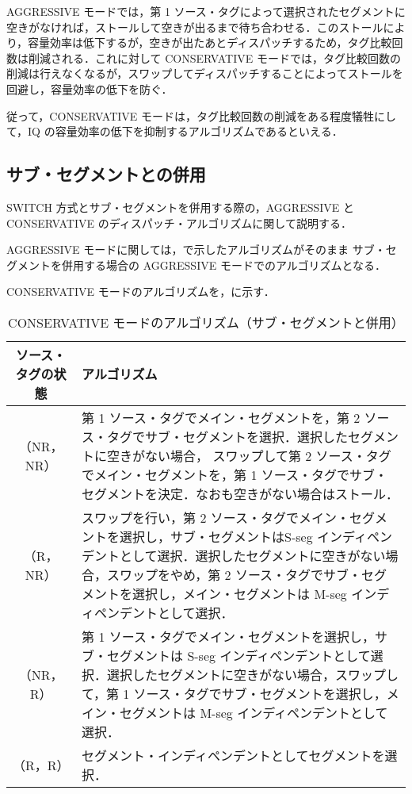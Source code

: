 AGGRESSIVE モードでは，第 1 ソース・タグによって選択されたセグメントに空きがなければ，ストールして空きが出るまで待ち合わせる．このストールにより，容量効率は低下するが，空きが出たあとディスパッチするため，タグ比較回数は削減される．これに対して CONSERVATIVE モードでは，タグ比較回数の削減は行えなくなるが，スワップしてディスパッチすることによってストールを回避し，容量効率の低下を防ぐ．

従って，CONSERVATIVE モードは，タグ比較回数の削減をある程度犠牲にして，IQ の容量効率の低下を抑制するアルゴリズムであるといえる．

\subsection{サブ・セグメントとの併用}
SWITCH 方式とサブ・セグメントを併用する際の，AGGRESSIVE と CONSERVATIVE のディスパッチ・アルゴリズムに関して説明する．

AGGRESSIVE モードに関しては，で示したアルゴリズムがそのまま サブ・セグメントを併用する場合の AGGRESSIVE モードでのアルゴリズムとなる．

CONSERVATIVE モードのアルゴリズムを，に示す．
\begin{table}[htb]
  \caption{CONSERVATIVE モードのアルゴリズム（サブ・セグメントと併用）}
  \footnotesize
  \center
   \begin{tabular}{|c|p{13.5cm}|} \hline \hline
    ソース・タグの状態 & アルゴリズム \\ \hline
    （NR，NR） & 第 1 ソース・タグでメイン・セグメントを，第 2 ソース・タグでサブ・セグメントを選択．選択したセグメントに空きがない場合， スワップして第 2 ソース・タグでメイン・セグメントを，第 1 ソース・タグでサブ・セグメントを決定．なおも空きがない場合はストール． \\ \hline
    （R，NR） & スワップを行い，第 2 ソース・タグでメイン・セグメントを選択し，サブ・セグメントはS-seg インディペンデントとして選択．選択したセグメントに空きがない場合，スワップをやめ，第 2 ソース・タグでサブ・セグメントを選択し，メイン・セグメントは M-seg インディペンデントとして選択．\\ \hline
    （NR，R） & 第 1 ソース・タグでメイン・セグメントを選択し，サブ・セグメントは S-seg インディペンデントとして選択．選択したセグメントに空きがない場合，スワップして，第 1 ソース・タグでサブ・セグメントを選択し，メイン・セグメントは M-seg インディペンデントとして選択．\\ \hline
    （R，R） & セグメント・インディペンデントとしてセグメントを選択． \\ \hline
  \end{tabular}
  \label{tab:cons_algorithm_subseg}
\end{table}

